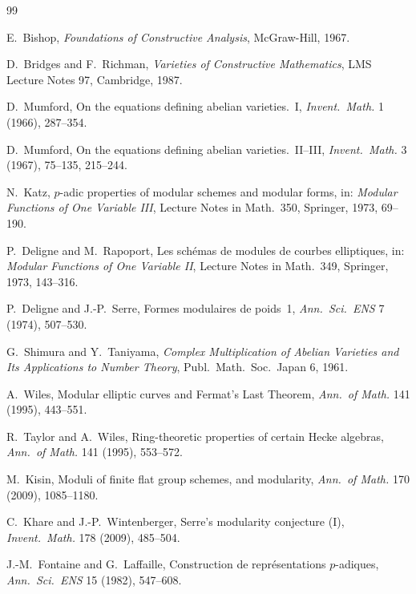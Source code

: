 \documentclass[11pt,a4paper]{article}
\theoremstyle{plain}
\theoremstyle{definition}
\begin{document}
\begin{thebibliography}{99}

 E.\ Bishop, \emph{Foundations of Constructive Analysis}, McGraw-Hill, 1967.

 D.\ Bridges and F.\ Richman, \emph{Varieties of Constructive Mathematics}, LMS Lecture Notes 97, Cambridge, 1987.

 D.\ Mumford, On the equations defining abelian varieties.\ I, \emph{Invent.\ Math.} 1 (1966), 287--354.

 D.\ Mumford, On the equations defining abelian varieties.\ II--III, \emph{Invent.\ Math.} 3 (1967), 75--135, 215--244.

 N.\ Katz, $p$-adic properties of modular schemes and modular forms, in: \emph{Modular Functions of One Variable III}, Lecture Notes in Math.~350, Springer, 1973, 69--190.

 P.\ Deligne and M.\ Rapoport, Les sch\'emas de modules de courbes elliptiques, in: \emph{Modular Functions of One Variable II}, Lecture Notes in Math.~349, Springer, 1973, 143--316.

 P.\ Deligne and J.-P.\ Serre, Formes modulaires de poids~1, \emph{Ann.\ Sci.\ ENS} 7 (1974), 507--530.

 G.\ Shimura and Y.\ Taniyama, \emph{Complex Multiplication of Abelian Varieties and Its Applications to Number Theory}, Publ.\ Math.\ Soc.\ Japan 6, 1961.

 A.\ Wiles, Modular elliptic curves and Fermat's Last Theorem, \emph{Ann.\ of Math.} 141 (1995), 443--551.

 R.\ Taylor and A.\ Wiles, Ring-theoretic properties of certain Hecke algebras, \emph{Ann.\ of Math.} 141 (1995), 553--572.

 M.\ Kisin, Moduli of finite flat group schemes, and modularity, \emph{Ann.\ of Math.} 170 (2009), 1085--1180.

 C.\ Khare and J.-P.\ Wintenberger, Serre's modularity conjecture (I), \emph{Invent.\ Math.} 178 (2009), 485--504.

 J.-M.\ Fontaine and G.\ Laffaille, Construction de repr\'esentations $p$-adiques, \emph{Ann.\ Sci.\ ENS} 15 (1982), 547--608.


\end{thebibliography}
\end{document}
